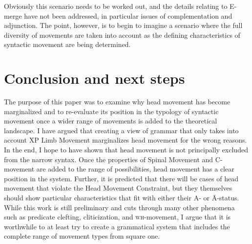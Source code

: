 \documentclass[output=paper,colorlinks,citecolor=brown,
]{langscibook}
\begin{document}
Obviously this scenario needs to be worked out, and the details relating to E-merge have not been addressed,  in particular issues of complementation and adjunction.  The point, however, is to begin to imagine a scenario where the full diversity of movements are taken into account as the defining characteristics of syntactic movement are being determined. 








\section{Conclusion and next steps}

The purpose of this paper was to examine why head movement has become marginalized and to re-evaluate its position in the typology of syntactic movement once a wider range of movements is added to the theoretical landscape.  I have argued that creating a view of grammar that only takes into account XP Limb Movement marginalizes head movement for the wrong reasons.  In the end, I hope to have shown that head movement is not principally excluded from the narrow syntax.  Once the properties of Spinal Movement and C-movement are added to the range of possibilities, head movement has a clear position in the system.  Further, it is predicted that there will be cases of head movement that violate the Head Movement Constraint, but they themselves should show particular characteristics that fit with either their A- or \=A-status.  While this work is still preliminary and cuts through many other phenomena such as predicate clefting, cliticization, and \textsc{wh}-movement, I argue that it is worthwhile to at least try to create a grammatical system that includes the complete range of movement types from square one.
\end{document}
